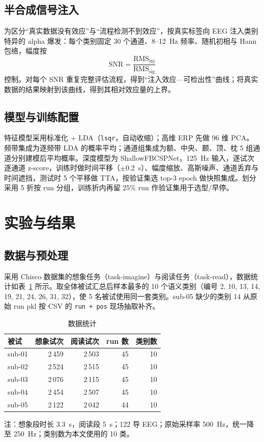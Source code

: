 \documentclass[twocolumn,10pt]{ctexart}
\begin{document}
\subsection{半合成信号注入}

为区分“真实数据没有效应”与“流程检测不到效应”，按真实标签向 EEG 注入类别特异的 alpha 爆发：每个类别固定 30 个通道、8--12~Hz 频率、随机初相与 Hann 包络，幅度按
\begin{equation}
\mathrm{SNR}=\frac{\mathrm{RMS}_{\mathrm{inj}}}{\mathrm{RMS}_{\mathrm{sig}}}
\end{equation}
控制。对每个 SNR 重复完整评估流程，得到“注入效应—可检出性”曲线；将真实数据的结果映射到该曲线，得到其相对效应量的上界。

\subsection{模型与训练配置}

特征模型采用标准化 + LDA（\texttt{lsqr}，自动收缩）；高维 ERP 先做 96 维 PCA。频带集成为逐频带 LDA 的概率平均；通道组集成为额、中央、颞、顶、枕 5 组通道分别建模后平均概率。深度模型为 ShallowFBCSPNet，125~Hz 输入，逐试次逐通道 z-score，训练时做时间平移（$\pm0.2$~s）、幅度缩放、高斯噪声、通道丢弃与时间遮挡，测试时 5 个平移做 TTA，按验证集选 top-3 epoch 做快照集成。划分采用 5 折按 run 分组，训练折内再留 25\% run 作验证集用于选型/早停。

\section{实验与结果}

\subsection{数据与预处理}

采用 Chisco 数据集的想象任务（task-imagine）与阅读任务（task-read），数据统计如表~\ref{tab:data} 所示。取全体被试汇总后样本最多的 10 个语义类别（编号 2, 10, 13, 14, 19, 21, 24, 26, 31, 32），使 5 名被试使用同一套类别。sub-05 缺少的类别 14 从原始 run pkl 按 CSV 的 \texttt{run + pos} 现场抽取补齐。

\begin{table}[H]
\centering
\caption{数据统计}
\label{tab:data}
\footnotesize
\begin{tabular}{lrrrr}
\toprule
被试 & 想象试次 & 阅读试次 & run 数 & 类别数 \\
\midrule
sub-01 & 2\,459 & 2\,503 & 45 & 10 \\
sub-02 & 2\,524 & 2\,515 & 45 & 10 \\
sub-03 & 2\,076 & 2\,115 & 45 & 10 \\
sub-04 & 2\,454 & 2\,507 & 45 & 10 \\
sub-05 & 2\,122 & 2\,042 & 44 & 10 \\
\bottomrule
\end{tabular}

\vspace{0.2em}
\parbox{\columnwidth}{\scriptsize 注：想象段时长 3.3~s，阅读段 5~s；122 导 EEG；原始采样率 500~Hz，统一降至 250~Hz；类别数为本文使用的 10 类。}
\end{table}
\end{document}

